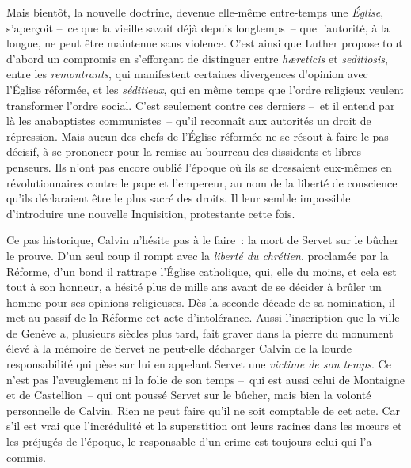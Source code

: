 \documentclass[french,twoside]{book} %
\newcommand{\astermono}{\medskip\centerline{\color{rubric}\large\selectfont{\syms ✻}}\medskip\par}%
\newcommand\foreign[1]{\emph{#1}}
\begin{document}
\noindent Mais bientôt, la nouvelle doctrine, devenue elle-même entre-temps une \emph{Église}, s’aperçoit – ce que la vieille savait déjà depuis longtemps – que l’autorité, à la longue, ne peut être maintenue sans violence. C’est ainsi que Luther propose tout d’abord un compromis en s’efforçant de distinguer entre \foreign{hæreticis} et \foreign{seditiosis}, entre les \emph{remontrants}, qui manifestent certaines divergences d’opinion avec l’Église réformée, et les \emph{séditieux}, qui en même temps que l’ordre religieux veulent transformer l’ordre social. C’est seulement contre ces derniers – et il entend par là les anabaptistes communistes – qu’il reconnaît aux autorités un droit de répression. Mais aucun des chefs de l’Église réformée ne se résout à faire le pas décisif, à se prononcer pour la remise au bourreau des dissidents et libres penseurs. Ils n’ont pas encore oublié l’époque où ils se dressaient eux-mêmes en révolutionnaires contre le pape et l’empereur, au nom de la liberté de conscience qu’ils déclaraient être le plus sacré des droits. Il leur semble impossible d’introduire une nouvelle Inquisition, protestante cette fois.\par
Ce pas historique, Calvin n’hésite pas à le faire : la mort de Servet sur le bûcher le prouve. D’un seul coup il rompt avec la \emph{liberté du chrétien}, proclamée par la Réforme, d’un bond il rattrape l’Église catholique, qui, elle du moins, et cela est tout à son honneur, a hésité plus de mille ans avant de se décider à brûler un homme pour ses opinions religieuses. Dès la seconde décade de sa nomination, il met au passif de la Réforme cet acte d’intolérance. Aussi l’inscription que la ville de Genève a, plusieurs siècles plus tard, fait graver dans la pierre du monument élevé à la mémoire de Servet ne peut-elle décharger Calvin de la lourde responsabilité qui pèse sur lui en appelant Servet une \emph{victime de son temps}. Ce n’est pas l’aveuglement ni la folie de son temps – qui est aussi celui de Montaigne et de Castellion – qui ont poussé Servet sur le bûcher, mais bien la volonté personnelle de Calvin. Rien ne peut faire qu’il ne soit comptable de cet acte. Car s’il est vrai que l’incrédulité et la superstition ont leurs racines dans les mœurs et les préjugés de l’époque, le responsable d’un crime est toujours celui qui l’a commis.\par

\astermono
\end{document}
